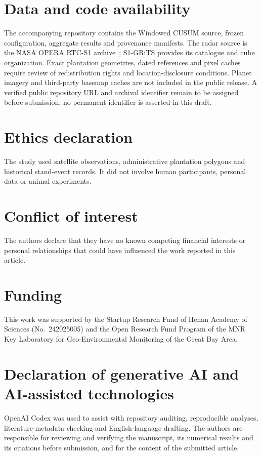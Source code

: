 \section*{Data and code availability}
The accompanying repository contains the Windowed CUSUM source, frozen configuration, aggregate results and provenance manifests. The radar source is the NASA OPERA RTC-S1 archive~\citep{opera2023rtc}; S1-GRiTS provides its catalogue and cube organization. Exact plantation geometries, dated references and pixel caches require review of redistribution rights and location-disclosure conditions. Planet imagery and third-party basemap caches are not included in the public release. A verified public repository URL and archival identifier remain to be assigned before submission; no permanent identifier is asserted in this draft.

\section*{Ethics declaration}
The study used satellite observations, administrative plantation polygons and historical stand-event records. It did not involve human participants, personal data or animal experiments.

\section*{Conflict of interest}
The authors declare that they have no known competing financial interests or personal relationships that could have influenced the work reported in this article.

\section*{Funding}
This work was supported by the Startup Research Fund of Henan Academy of Sciences (No.~242025005) and the Open Research Fund Program of the MNR Key Laboratory for Geo-Environmental Monitoring of the Great Bay Area.

\section*{Declaration of generative AI and AI-assisted technologies}
OpenAI Codex was used to assist with repository auditing, reproducible analyses, literature-metadata checking and English-language drafting. The authors are responsible for reviewing and verifying the manuscript, its numerical results and its citations before submission, and for the content of the submitted article.
